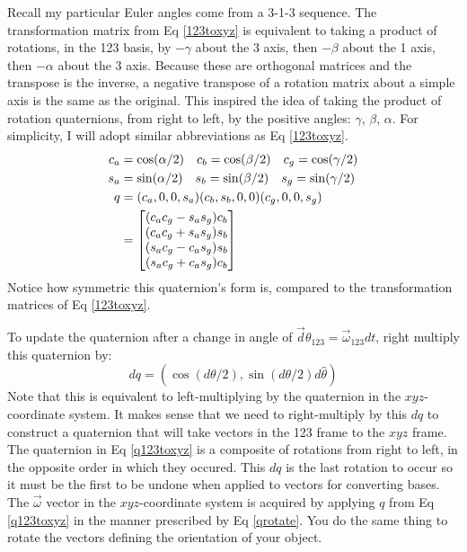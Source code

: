 \documentclass[10pt]{article}
\begin{document}
Recall my particular 
Euler angles come from a 3-1-3 sequence. The transformation matrix from 
Eq \ref{123toxyz} is equivalent to taking a product of rotations, 
in the 123 basis, by $-\gamma$ about the 3 axis, then $-\beta$ about the 
1 axis, then $-\alpha$ about the 3 axis. Because these are orthogonal matrices
and the transpose is the inverse, a negative transpose of a rotation 
matrix about a simple axis is the same as the original. 
This inspired the idea of taking the product of rotation quaternions, 
from right to left, by the positive angles: $\gamma$, $\beta$, $\alpha$. 
For simplicity, I will adopt similar abbreviations as Eq \ref{123toxyz}.
\begin{align}
    c_a &=\cos(\alpha/2)\quad c_b=\cos(\beta/2)\quad c_g=\cos(\gamma/2)\notag\\
    s_a &=\sin(\alpha/2)\quad s_b=\sin(\beta/2)\quad s_g=\sin(\gamma/2)\notag\\
    q &= (c_a,0,0,s_a)(c_b,s_b,0,0)(c_g,0,0,s_g) \\
     &= 
    \begin{bmatrix}
        (c_ac_g - s_as_g)c_b \\
        (c_ac_g + s_as_g)s_b \\
        (s_ac_g - c_as_g)s_b \\
        (s_ac_g + c_as_g)c_b
    \end{bmatrix} \label{q123toxyz}    
\end{align}
Notice how symmetric this quaternion's form is, compared to the 
transformation matrices of Eq \ref{123toxyz}. 

To update the quaternion after 
a change in angle of $\vec d\theta_{123}=\vec{\omega}_{123}dt$, 
right multiply this quaternion by:
\begin{equation}
    dq = (\cos(d\theta/2),\sin(d\theta/2)d\hat{\theta})
\end{equation}
Note that this is equivalent to left-multiplying by the quaternion in the 
$xyz$-coordinate system. It makes sense that we need to right-multiply by 
this $dq$ to construct a quaternion that will 
take vectors in the 123 frame to the $xyz$ frame. The quaternion in Eq 
\ref{q123toxyz} is a composite of rotations from right to left, in the 
opposite order in which they occured. This $dq$ is the last rotation to 
occur so it must be the first to be undone when applied to vectors 
for converting bases. The $\vec{\omega}$ vector in the 
$xyz$-coordinate system is acquired by applying $q$ from Eq \ref{q123toxyz}
in the manner prescribed by Eq \ref{qrotate}. You do the same thing 
to rotate the vectors defining the orientation of your object.
\end{document}
